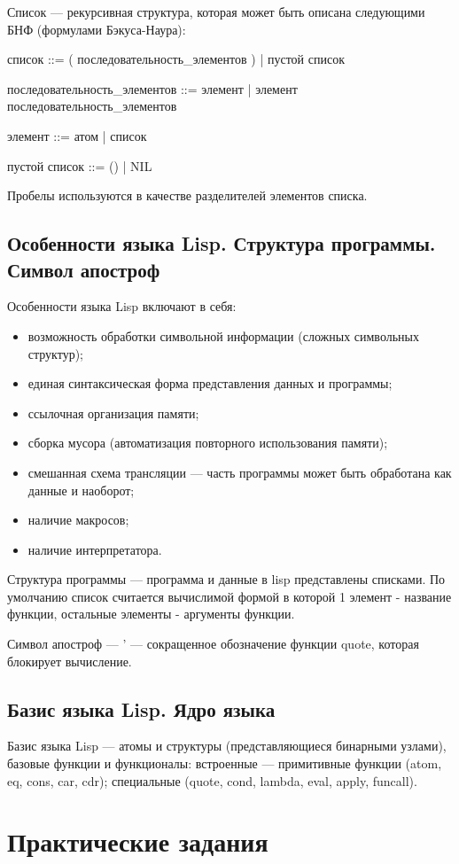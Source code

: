 Список --- рекурсивная структура, которая может быть описана следующими БНФ (формулами Бэкуса-Наура):

список ::= ( последовательность\_элементов ) | пустой список

последовательность\_элементов ::= элемент | элемент  последовательность\_элементов

элемент ::= атом | список

пустой список ::= () | NIL

Пробелы используются в качестве разделителей элементов списка.

\section{Особенности языка Lisp. Структура программы. Символ апостроф}
Особенности языка Lisp включают в себя:
\begin{itemize}
\item возможность обработки символьной информации (сложных символьных структур);
\item единая синтаксическая форма представления данных и программы;
\item ссылочная организация памяти;
\item сборка мусора (автоматизация повторного использования памяти);
\item смешанная схема трансляции --- часть программы может быть обработана как данные и наоборот;
\item наличие макросов;
\item наличие интерпретатора.
\end{itemize}

Структура программы --- программа и данные в lisp представлены списками. По умолчанию список считается вычислимой формой в которой 1 элемент - название функции, остальные элементы - аргументы функции.

Символ апостроф --- ' --- сокращенное обозначение функции quote, которая блокирует вычисление.

\section{Базис языка Lisp. Ядро языка}
Базис языка Lisp --- атомы и структуры (представляющиеся бинарными узлами), базовые функции и функционалы: встроенные — примитивные функции (atom, eq, cons, car, cdr); специальные (quote, cond, lambda, eval, apply, funcall).
\chapter{Практические задания}
